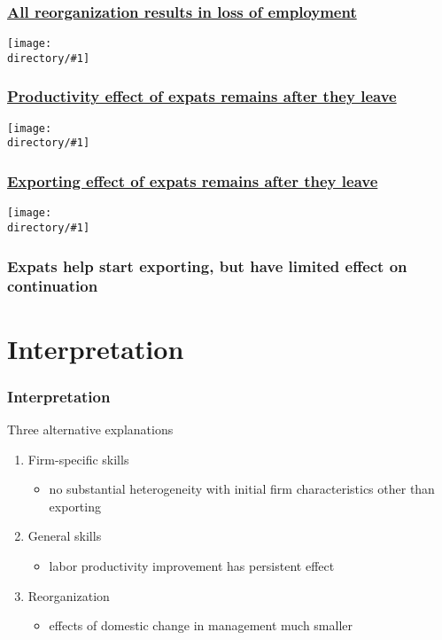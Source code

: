 \documentclass[aspectratio=43,compress,mathserif]{beamer}
\newcommand{\regressiontable}[1]{}
\newcommand{\directory}{output/figure}
\newcommand{\widefigure}[2]{\begin{frame}\frametitle{\hyperlink{#1back}{#2}}\hypertarget{#1}{{\begin{center}\texttt{[image: \\directory/\#1]}\end{center}}}\end{frame}}
\begin{document}
\widefigure{lnL_tree}{All reorganization results in loss of employment}
\widefigure{lnQL_tree}{Productivity effect of expats remains after they leave}
\widefigure{exporter_tree}{Exporting effect of expats remains after they leave}


\begin{frame}\frametitle{Expats help start exporting, but have limited effect on continuation}\hypertarget{Expats help start exporting, but have limited effect on continuation}{}
{\small
\regressiontable{exporter_heterogeneity}
}


\end{frame}







\section{Interpretation}\hypertarget{Interpretation}{}
\begin{frame}\frametitle{Interpretation}\hypertarget{Interpretation}{}
Three alternative explanations


\begin{enumerate}\setcounter{enumi}{0}
\item Firm-specific skills
\begin{itemize}
\item no substantial heterogeneity with initial firm characteristics other than exporting
\end{itemize}

\item General skills
\begin{itemize}
\item labor productivity improvement has persistent effect
\end{itemize}

\item Reorganization
\begin{itemize}
\item effects of domestic change in management much smaller


\end{itemize}

\end{enumerate}
\end{frame}
\end{document}
